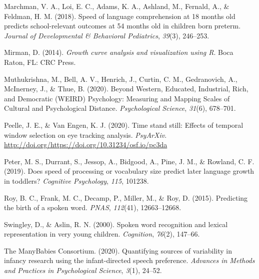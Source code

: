 \documentclass[10pt, letterpaper]{article}
\begin{document}
\leavevmode\hypertarget{ref-Marchman2018}{}%
Marchman, V. A., Loi, E. C., Adams, K. A., Ashland, M., Fernald, A., \&
Feldman, H. M. (2018). Speed of language comprehension at 18 months old
predicts school-relevant outcomes at 54 months old in children born
preterm. \emph{Journal of Developmental \& Behavioral Pediatrics},
\emph{39}(3), 246--253.

\leavevmode\hypertarget{ref-Mirman2014}{}%
Mirman, D. (2014). \emph{Growth curve analysis and visualization using
R}. Boca Raton, FL: CRC Press.

\leavevmode\hypertarget{ref-Muthukrishna2020}{}%
Muthukrishna, M., Bell, A. V., Henrich, J., Curtin, C. M., Gedranovich,
A., McInerney, J., \& Thue, B. (2020). Beyond Western, Educated,
Industrial, Rich, and Democratic (WEIRD) Psychology: Measuring and
Mapping Scales of Cultural and Psychological Distance.
\emph{Psychological Science}, \emph{31}(6), 678--701.

\leavevmode\hypertarget{ref-Peelle2020}{}%
Peelle, J. E., \& Van Engen, K. J. (2020). Time stand still: Effects of
temporal window selection on eye tracking analysis. \emph{PsyArXiv}.
\url{http://doi.org/https://doi.org/10.31234/osf.io/pc3da}

\leavevmode\hypertarget{ref-peter2019}{}%
Peter, M. S., Durrant, S., Jessop, A., Bidgood, A., Pine, J. M., \&
Rowland, C. F. (2019). Does speed of processing or vocabulary size
predict later language growth in toddlers? \emph{Cognitive Psychology},
\emph{115}, 101238.

\leavevmode\hypertarget{ref-Roy2015}{}%
Roy, B. C., Frank, M. C., Decamp, P., Miller, M., \& Roy, D. (2015).
Predicting the birth of a spoken word. \emph{PNAS}, \emph{112}(41),
12663--12668.

\leavevmode\hypertarget{ref-Swingley2000}{}%
Swingley, D., \& Aslin, R. N. (2000). Spoken word recognition and
lexical representation in very young children. \emph{Cognition},
\emph{76}(2), 147--66.

\leavevmode\hypertarget{ref-TheManyBabiesConsortium2020}{}%
The ManyBabies Consortium. (2020). Quantifying sources of variability in
infancy research using the infant-directed speech preference.
\emph{Advances in Methods and Practices in Psychological Science},
\emph{3}(1), 24--52.


\end{document}
